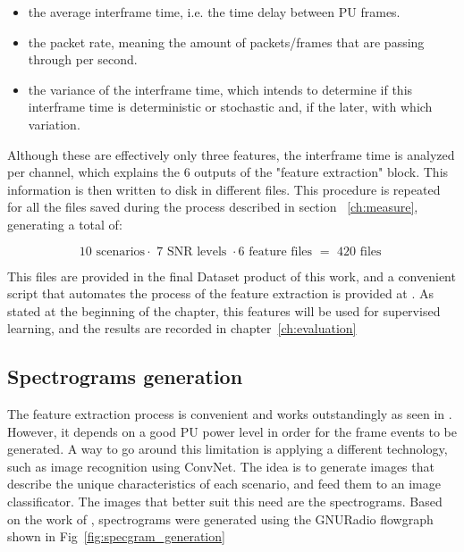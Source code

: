 \begin{itemize}
    \item the average interframe time, i.e. the time delay between \ac{PU} frames.
    \item the packet rate, meaning the amount of packets/frames that are passing through per second.
    \item the variance of the interframe time, which intends to determine if this interframe time is deterministic or stochastic and, if the later, with which variation.
\end{itemize}

Although these are effectively only three features, the interframe time is analyzed per channel, which explains the 6 outputs of the "feature extraction" block. This information is then written to disk in different files. This procedure is repeated for all the files saved during the process described in section ~\ref{ch:measure}, generating a total of:

\begin{equation}
    \text{10 scenarios} \cdot \text{ 7 SNR levels } \cdot \text{6 feature files } = \text{ 420 files }
\end{equation}

This files are provided in the final Dataset product of this work, and a convenient script that automates the process of the feature extraction is provided at \cite{repo:cognitive_radio_ml}. As stated at the beginning of the chapter, this features will be used for supervised learning, and the results are recorded in chapter~\ref{ch:evaluation}

\subsection{Spectrograms generation}\label{ch:spectrogram}

The feature extraction process is convenient and works outstandingly as seen in \cite{Wunsch2017}. However, it depends on a good \ac{PU} power level in order for the frame events to be generated. A way to go around this limitation is applying a different technology, such as image recognition using \ac{ConvNet}. The idea is to generate images that describe the unique characteristics of each scenario, and feed them to an image classificator. The images that better suit this need are the spectrograms. Based on the work of \cite{Paisana2017}, spectrograms were generated using the GNURadio flowgraph shown in Fig~\ref{fig:specgram_generation}


